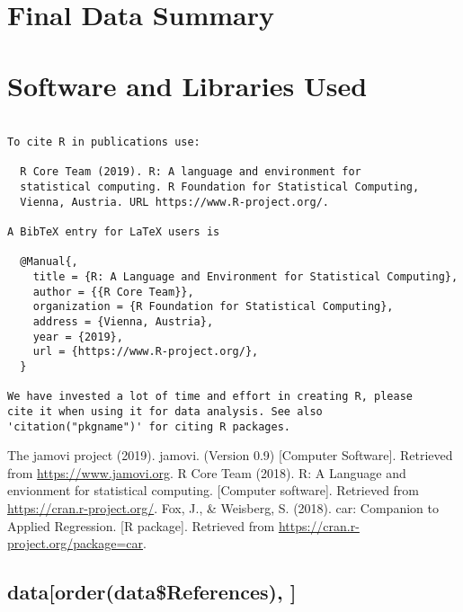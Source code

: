 \documentclass[]{article}
\begin{document}
\hypertarget{final-data-summary}{%
\section{Final Data Summary}\label{final-data-summary}}

\pagebreak

\hypertarget{software-and-libraries-used}{%
\section{Software and Libraries
Used}\label{software-and-libraries-used}}

\begin{verbatim}

To cite R in publications use:

  R Core Team (2019). R: A language and environment for
  statistical computing. R Foundation for Statistical Computing,
  Vienna, Austria. URL https://www.R-project.org/.

A BibTeX entry for LaTeX users is

  @Manual{,
    title = {R: A Language and Environment for Statistical Computing},
    author = {{R Core Team}},
    organization = {R Foundation for Statistical Computing},
    address = {Vienna, Austria},
    year = {2019},
    url = {https://www.R-project.org/},
  }

We have invested a lot of time and effort in creating R, please
cite it when using it for data analysis. See also
'citation("pkgname")' for citing R packages.
\end{verbatim}

The jamovi project (2019). jamovi. (Version 0.9) {[}Computer
Software{]}. Retrieved from \url{https://www.jamovi.org}. R Core Team
(2018). R: A Language and envionment for statistical computing.
{[}Computer software{]}. Retrieved from
\url{https://cran.r-project.org/}. Fox, J., \& Weisberg, S. (2018). car:
Companion to Applied Regression. {[}R package{]}. Retrieved from
\url{https://cran.r-project.org/package=car}.

\hypertarget{dataorderdatareferences}{%
\subsection{data{[}order(data\$References),
{]}}\label{dataorderdatareferences}}
\end{document}
